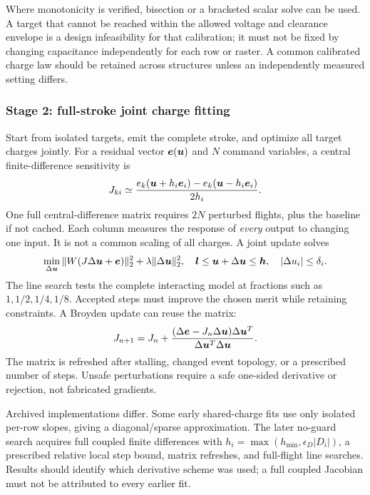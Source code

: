 Where monotonicity is verified, bisection or a bracketed scalar solve can be used. A target that cannot be reached within the allowed voltage and clearance envelope is a design infeasibility for that calibration; it must not be fixed by changing capacitance independently for each row or raster. A common calibrated charge law should be retained across structures unless an independently measured setting differs.

\subsubsection{Stage 2: full-stroke joint charge fitting}
Start from isolated targets, emit the complete stroke, and optimize all target charges jointly. For a residual vector $\boldsymbol{e}(\boldsymbol{u})$ and $N$ command variables, a central finite-difference sensitivity is
\begin{equation}
 J_{ki}\simeq\frac{e_k(\boldsymbol{u}+h_i\boldsymbol{e}_i)-e_k(\boldsymbol{u}-h_i\boldsymbol{e}_i)}{2h_i}.
\end{equation}
One full central-difference matrix requires $2N$ perturbed flights, plus the baseline if not cached. Each column measures the response of \emph{every} output to changing one input. It is not a common scaling of all charges. A joint update solves
\begin{equation}
 \min_{\Delta\boldsymbol{u}}\|W(J\Delta\boldsymbol{u}+\boldsymbol{e})\|_2^2
              +\lambda\|\Delta\boldsymbol{u}\|_2^2,
 \quad \boldsymbol{l}\leq\boldsymbol{u}+\Delta\boldsymbol{u}\leq\boldsymbol{h},
 \quad |\Delta u_i|\leq\delta_i.
\label{eq:joint}
\end{equation}
The line search tests the complete interacting model at fractions such as $1,1/2,1/4,1/8$. Accepted steps must improve the chosen merit while retaining constraints. A Broyden update can reuse the matrix:
\begin{equation}
 J_{n+1}=J_n+
 \frac{(\Delta\boldsymbol{e}-J_n\Delta\boldsymbol{u})\Delta\boldsymbol{u}^T}
      {\Delta\boldsymbol{u}^T\Delta\boldsymbol{u}}.
\end{equation}
The matrix is refreshed after stalling, changed event topology, or a prescribed number of steps. Unsafe perturbations require a safe one-sided derivative or rejection, not fabricated gradients.

Archived implementations differ. Some early shared-charge fits use only isolated per-row slopes, giving a diagonal/sparse approximation. The later no-guard search acquires full coupled finite differences with $h_i=\max(h_{\min},\epsilon_D|D_i|)$, a prescribed relative local step bound, matrix refreshes, and full-flight line searches. Results should identify which derivative scheme was used; a full coupled Jacobian must not be attributed to every earlier fit.

